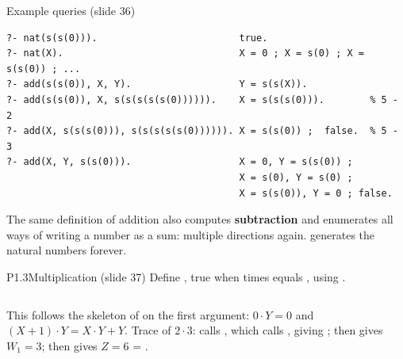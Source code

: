 \begin{nbfact}{Example queries (slide 36)}
\begin{verbatim}
?- nat(s(s(0))).                         true.
?- nat(X).                               X = 0 ; X = s(0) ; X = s(s(0)) ; ...
?- add(s(s(0)), X, Y).                   Y = s(s(X)).
?- add(s(s(0)), X, s(s(s(s(s(0)))))).    X = s(s(s(0))).        % 5 - 2
?- add(X, s(s(s(0))), s(s(s(s(s(0)))))). X = s(s(0)) ;  false.  % 5 - 3
?- add(X, Y, s(s(0))).                   X = 0, Y = s(s(0)) ;
                                         X = s(0), Y = s(0) ;
                                         X = s(s(0)), Y = 0 ; false.
\end{verbatim}
The same definition of addition also computes \textbf{subtraction} and enumerates all ways
of writing a number as a sum: multiple directions again.  generates the natural
numbers forever.
\end{nbfact}

\begin{nbexercise}{P1.3}{Multiplication (slide 37)}
Define , true when  times  equals , using
.
\end{nbexercise}
\begin{nbsolution}
\inputminted{prolog}{sections/prolog/prolog-basics/assets/mult-solution.pl}
This follows the skeleton of  on the first argument: $0 \cdot Y = 0$ and
$(X+1)\cdot Y = X\cdot Y + Y$. Trace of $2 \cdot 3$: 
calls , which calls , giving
; then  gives $W_1 = 3$; then
 gives $Z = 6$ = .
\end{nbsolution}
